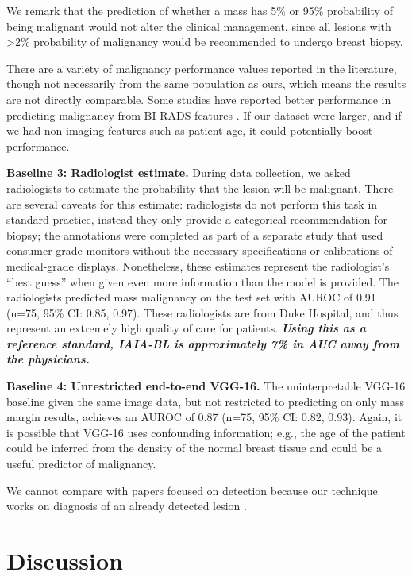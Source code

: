 \documentclass[11pt]{article}
\begin{document}
We remark that the prediction of whether a mass has 5\% or 95\% probability of being malignant would not alter the clinical management, since all lesions with \textgreater 2\% probability of malignancy would be recommended to undergo breast biopsy.

There are a variety of malignancy performance values reported in the literature, though not necessarily from the same population as ours, which means the results are not directly comparable. Some studies have reported better performance in predicting malignancy from BI-RADS features
\citep{elter2007prediction,benndorf2015external,burnside2009probabilistic}. 
If our dataset were larger, and if we had non-imaging features such as patient age, it could potentially boost performance.


\textbf{Baseline 3: Radiologist estimate.} During data collection, we asked radiologists to estimate the probability that the lesion will be malignant. There are several caveats for this estimate: radiologists do not perform this task in standard practice, instead they only provide a categorical recommendation for biopsy; the annotations were completed as part of a separate study that used consumer-grade monitors without the necessary specifications or calibrations of medical-grade displays. Nonetheless, these estimates represent the radiologist's ``best guess'' when given even more information than the model is provided.
The radiologists predicted mass malignancy on the test set with AUROC of 0.91 (n=75, 95\% CI: 0.85, 0.97). These radiologists are from Duke Hospital, and thus represent an extremely high quality of care for patients. \textbf{\textit{Using this as a reference standard, IAIA-BL is approximately 7\% in AUC away from the physicians.}} 

\textbf{Baseline 4: Unrestricted end-to-end VGG-16.} The uninterpretable VGG-16 baseline given the same image data, but not restricted to predicting on only mass margin results, achieves an AUROC of 0.87 (n=75, 95\% CI: 0.82, 0.93). Again, it is possible that VGG-16 uses confounding information; e.g., the age of the patient could be inferred from the density of the normal breast tissue and could be a useful predictor of malignancy. 

We cannot compare with papers focused on detection because our technique works on diagnosis of an already detected lesion \cite{mckinney2020international,wu2019deep}.

\FloatBarrier

\section{Discussion}
\end{document}
